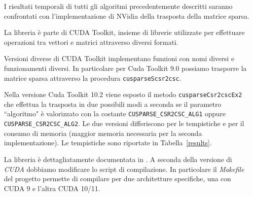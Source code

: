 I risultati temporali di tutti gli algoritmi precedentemente descritti saranno confrontati con l'implementazione di NVidia della trasposta della matrice sparsa. 

La libreria \cuSPARSE è parte di \textrm{CUDA Toolkit}, insieme di librerie utilizzate per effettuare operazioni tra vettori e matrici attraverso diversi formati. 

Versioni diverse di \textrm{CUDA Toolkit} implementano funzioni con nomi diversi e funzionamenti diversi. In particolare per \textrm{Cuda Toolkit 9.0} possiamo trasporre la matrice sparsa attraverso la procedura \texttt{cusparseScsr2csc}.

Nella versione \textrm{Cuda Toolkit 10.2} viene esposto il metodo \texttt{cusparseCsr2cscEx2} che effettua la trasposta in due possibili modi a seconda se il parametro ``algoritmo" è valorizzato con la costante \texttt{CUSPARSE\_CSR2CSC\_ALG1} oppure \texttt{CUSPARSE\_CSR2CSC\_ALG2}. Le due versioni differiscono per le tempistiche e per il consumo di memoria (maggior memoria necessaria per la seconda implementazione). Le tempistiche sono riportate in Tabella~\ref{results}.

La libreria è dettagliatamente documentata in \cite{cusparse}. A seconda della versione di \emph{CUDA} dobbiamo modificare lo script di compilazione. In particolare il \emph{Makefile} del progetto permette di compilare per due architetture specifiche, una con CUDA 9 e l'altra CUDA 10/11. 